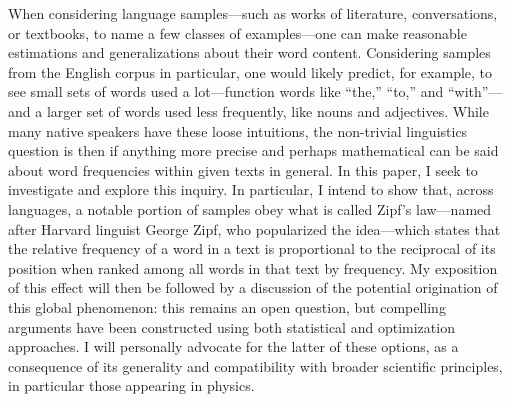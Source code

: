 \documentclass[10pt]{article}
\begin{document}
\begin{flushleft}
    \hspace*{0.5in} When considering language samples---such as works of literature, conversations, or textbooks, to name a few classes of examples---one can make reasonable estimations and generalizations about their word content. Considering samples from the English corpus in particular, one would likely predict, for example, to see small sets of words used a lot---function words like ``the,'' ``to,'' and ``with''---and a larger set of words used less frequently, like nouns and adjectives. While many native speakers have these loose intuitions, the non-trivial linguistics question is then if anything more precise and perhaps mathematical can be said about word frequencies within given texts in general. In this paper, I seek to investigate and explore this inquiry. In particular, I intend to show that, across languages, a notable portion of samples obey what is called Zipf's law---named after Harvard linguist George Zipf, who popularized the idea---which states that the relative frequency of a word in a text is proportional to the reciprocal of its position when ranked among all words in that text by frequency. My exposition of this effect will then be followed by a discussion of the potential origination of this global phenomenon: this remains an open question, but compelling arguments have been constructed using both statistical and optimization approaches. I will personally advocate for the latter of these options, as a consequence of its generality and compatibility with broader scientific principles, in particular those appearing in physics.
    

\end{flushleft}
\end{document}
